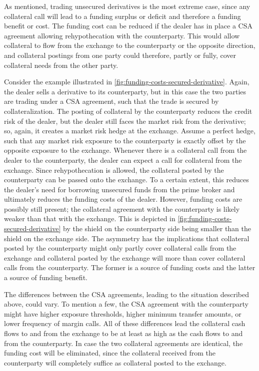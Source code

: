 \documentclass[main.tex]{subfiles}
\begin{document}
        As mentioned, trading unsecured derivatives is the most extreme case,
        since any collateral call will lead to a funding surplus or deficit and therefore a funding benefit or cost.
        The funding cost can be reduced if the dealer has in place 
        a CSA agreement allowing rehypothecation with the counterparty.
        This would allow collateral to flow from the exchange to the counterparty or the opposite direction, 
        and collateral postings from one party could therefore, partly or fully, 
        cover collateral needs from the other party.

        Consider the example illustrated in \cref{fig:funding-costs-secured-derivative}.
        Again, the dealer sells a derivative to its counterparty,
        but in this case the two parties are trading under a CSA agreement, 
        such that the trade is secured by collateralization.
        The posting of collateral by the counterparty reduces the credit risk of the dealer,
        but the dealer still faces the market risk from the derivative;
        so, again, it creates a market risk hedge at the exchange.
        Assume a perfect hedge, such that any market risk exposure to the counterparty 
        is exactly offset by the opposite exposure to the exchange.
        Whenever there is a collateral call from the dealer to the counterparty,
        the dealer can expect a call for collateral from the exchange.
        Since rehypothecation is allowed,
        the collateral posted by the counterparty can be passed onto the exchange.
        To a certain extent, this reduces the dealer's need for borrowing unsecured funds from the prime broker
        and ultimately reduces the funding costs of the dealer.
        However, funding costs are possibly still present;
        the collateral agreement with the counterparty is likely weaker than that with the exchange. 
        This is depicted in \cref{fig:funding-costs-secured-derivative} 
        by the shield on the counterparty side being smaller than the shield on the exchange side.
        The asymmetry has the implications that 
        collateral posted by the counterparty might only partly cover collateral calls from the exchange 
        and collateral posted by the exchange will more than cover collateral calls from the counterparty.
        The former is a source of funding costs and the latter a source of funding benefit.

        The differences between the CSA agreements, leading to the situation described above, could vary. 
        To mention a few, the CSA agreement with the counterparty might have higher exposure thresholds, 
        higher minimum transfer amounts, or lower frequency of margin calls.
        All of these differences lead the collateral cash flows to and from the exchange 
        to be at least as high as the cash flows to and from the counterparty. 
        In case the two collateral agreements are identical, the funding cost will be eliminated, 
        since the collateral received from the counterparty will completely suffice as collateral posted to the exchange.
        
\end{document}
